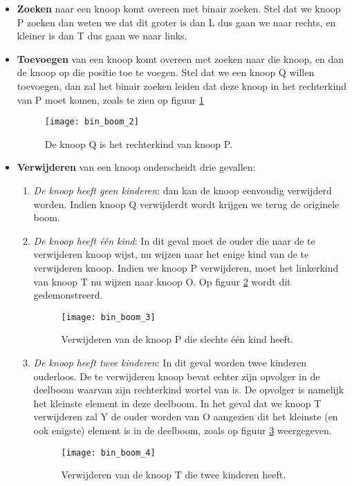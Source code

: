 \documentclass{report}
\begin{document}
	\begin{itemize}
		\item \textbf{Zoeken} naar een knoop komt overeen met binair zoeken. Stel dat we knoop P zoeken dan weten we dat dit groter is dan L dus gaan we naar rechts, en kleiner is dan T dus gaan we naar links.
		
		\item \textbf{Toevoegen} van een knoop komt overeen met zoeken naar die knoop, en dan de knoop op die positie toe te voegen. Stel dat we een knoop Q willen toevoegen, dan zal het binair zoeken leiden dat deze knoop in het rechterkind van P moet komen, zoals te zien op figuur \ref{fig:bin_boom_2}
		
	\begin{figure}[h]
		\centering
		\texttt{[image: bin\_boom\_2]}
		\caption{De knoop Q is het rechterkind van knoop P.}
		\label{fig:bin_boom_2}
	\end{figure}

	
		\item \textbf{Verwijderen} van een knoop onderscheidt drie gevallen: 
			\begin{enumerate}
				\item \textit{De knoop heeft geen kinderen}: dan kan de knoop eenvoudig verwijderd worden. Indien knoop Q verwijderdt wordt krijgen we terug de originele boom.
				
				\item \textit{De knoop heeft één kind}: In dit geval moet de ouder die naar de te verwijderen knoop wijst, nu wijzen naar het enige kind van de te verwijderen knoop. Indien we knoop P verwijderen, moet het linkerkind van knoop T nu wijzen naar knoop O. Op figuur \ref{fig:bin_boom_3} wordt dit gedemonstreerd.
				
				\begin{figure}[h]
					\centering
					\texttt{[image: bin\_boom\_3]}
					\caption{Verwijderen van de knoop P die slechts één kind heeft.}
					\label{fig:bin_boom_3}
				\end{figure}

			
				\item \textit{De knoop heeft twee kinderen}: In dit geval worden twee kinderen ouderloos. De te verwijderen knoop bevat echter zijn opvolger in de deelboom waarvan zijn rechterkind wortel van is. De opvolger is namelijk het kleinste element in deze deelboom. In het geval dat we knoop T verwijderen zal Y de ouder worden van O aangezien dit het kleinste (en ook enigste) element is in de deelboom, zoals op figuur \ref{fig:bin_boom_4} weergegeven.
				
				\begin{figure}[h]
					\centering
					\texttt{[image: bin\_boom\_4]}
					\caption{Verwijderen van de knoop T die twee kinderen heeft.}
					\label{fig:bin_boom_4}
				\end{figure}		
			\end{enumerate}
	\end{itemize}
\end{document}
